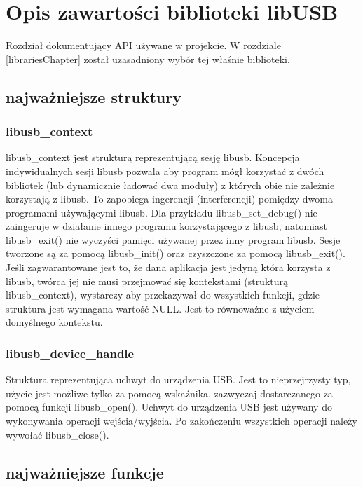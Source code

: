 \documentclass{BscUS}
\begin{document}
\chapter{Opis zawartości biblioteki libUSB}
\label{libUsbChapter}
\indent Rozdział dokumentujący API używane w projekcie. W rozdziale \ref{librariesChapter} został uzasadniony wybór tej właśnie biblioteki. \cite{libusbDoc}
\section{najważniejsze struktury}
\subsection{libusb\_context}
libusb\_context jest strukturą reprezentującą sesję libusb.
\newline
Koncepcja indywidualnych sesji libusb pozwala aby program mógł korzystać z dwóch bibliotek (lub dynamicznie ładować dwa moduły) z których obie nie zależnie korzystają z libusb. To zapobiega ingerencji (interferencji) pomiędzy dwoma programami używającymi libusb. Dla przykładu libusb\_set\_debug() nie zaingeruje w działanie innego programu korzystającego z libusb, natomiast libusb\_exit() nie wyczyści pamięci używanej przez inny program libusb.
\newline
Sesje tworzone są za pomocą libusb\_init() oraz czyszczone za pomocą libusb\_exit(). Jeśli zagwarantowane jest to, że dana aplikacja jest jedyną która korzysta z libusb, twórca jej nie musi przejmować się kontekstami (strukturą libusb\_context), wystarczy aby przekazywał do wszystkich funkcji, gdzie struktura jest wymagana wartość NULL. Jest to równoważne z użyciem domyślnego kontekstu.

\subsection{libusb\_device\_handle}
Struktura reprezentująca uchwyt do urządzenia USB.
\newline
Jest to nieprzejrzysty typ, użycie jest możliwe tylko za pomocą wskaźnika, zazwyczaj dostarczanego za pomocą funkcji libusb\_open().
\newline
Uchwyt do urządzenia USB jest używany do wykonywania operacji wejścia/wyjścia. Po zakończeniu wszystkich operacji należy wywołać libusb\_close().

\section{najważniejsze funkcje}
\end{document}
